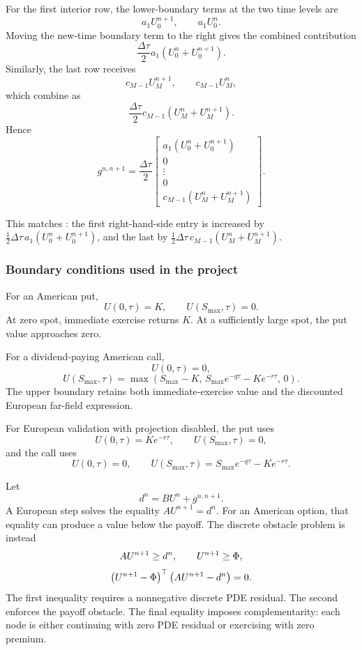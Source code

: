 For the first interior row, the lower-boundary terms at the two time levels are
\[
  a_1U_0^{n+1},
  \qquad
  a_1U_0^n.
\]
Moving the new-time boundary term to the right gives the combined contribution
\[
  \frac{\Delta\tau}{2}a_1
  \left(U_0^n+U_0^{n+1}\right).
\]
Similarly, the last row receives
\[
  c_{M-1}U_M^{n+1},
  \qquad
  c_{M-1}U_M^n,
\]
which combine as
\[
  \frac{\Delta\tau}{2}c_{M-1}
  \left(U_M^n+U_M^{n+1}\right).
\]
Hence
\[
  g^{n,n+1}
  =
  \frac{\Delta\tau}{2}
  \begin{bmatrix}
    a_1(U_0^n+U_0^{n+1})\\
    0\\
    \vdots\\
    0\\
    c_{M-1}(U_M^n+U_M^{n+1})
  \end{bmatrix}.
\]

\begin{implementationcheck}
This matches : the first right-hand-side entry is
increased by
\(\tfrac12\Delta\tau\,a_1(U_0^n+U_0^{n+1})\), and the last by
\(\tfrac12\Delta\tau\,c_{M-1}(U_M^n+U_M^{n+1})\).
\end{implementationcheck}

\subsubsection{Boundary conditions used in the project}
For an American put,
\[
  U(0,\tau)=K,
  \qquad
  U(S_{\max},\tau)=0.
\]
At zero spot, immediate exercise returns \(K\). At a sufficiently large spot,
the put value approaches zero.

For a dividend-paying American call,
\[
  U(0,\tau)=0,
\]
\[
  U(S_{\max},\tau)
  =
  \max\!\left(
    S_{\max}-K,\,
    S_{\max}e^{-q\tau}-Ke^{-r\tau},\,
    0
  \right).
\]
The upper boundary retains both immediate-exercise value and the discounted
European far-field expression.

For European validation with projection disabled, the put uses
\[
  U(0,\tau)=Ke^{-r\tau},
  \qquad
  U(S_{\max},\tau)=0,
\]
and the call uses
\[
  U(0,\tau)=0,
  \qquad
  U(S_{\max},\tau)=S_{\max}e^{-q\tau}-Ke^{-r\tau}.
\]

Let
\[
  d^n=BU^n+g^{n,n+1}.
\]
A European step solves the equality \(AU^{n+1}=d^n\). For an American option,
that equality can produce a value below the payoff. The discrete obstacle
problem is instead
\[
  AU^{n+1}\geq d^n,
  \qquad
  U^{n+1}\geq\Phi,
\]
\[
  \left(U^{n+1}-\Phi\right)^\top
  \left(AU^{n+1}-d^n\right)=0.
\]
The first inequality requires a nonnegative discrete PDE residual. The second
enforces the payoff obstacle. The final equality imposes complementarity:
each node is either continuing with zero PDE residual or exercising with zero
premium.

